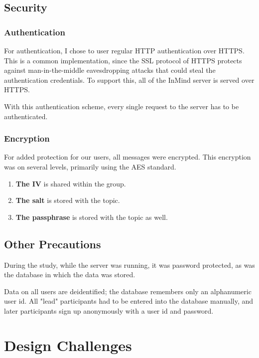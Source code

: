     \subsection{Security}
    \label{sec:security}
      \subsubsection{Authentication}
        For authentication, I chose to user regular HTTP authentication over HTTPS.
        This is a common implementation, since the SSL protocol of HTTPS
        protects against man-in-the-middle
        eavesdropping attacks that could steal the authentication credentials.
        To support this, all of the InMind server is served over HTTPS.

        With this authentication scheme,
        every single request to the server has to be authenticated.

      \subsubsection{Encryption}
        For added protection for our users, all messages were encrypted.
        This encryption was on several levels, primarily using the AES standard.

        \begin{enumerate}
        \item \textbf{The IV} is shared within the group.
        \item \textbf{The salt} is stored with the topic.
        \item \textbf{The passphrase} is stored with the topic as well.
        \end{enumerate}

      \subsection{Other Precautions}
      During the study, while the server was running, it was password protected,
      as was the database in which the data was stored.

      Data on all users are deidentified;
      the database remembers only an alphanumeric user id.
      All "lead" participants had to be entered into the database manually,
      and later participants sign up anonymously with a user id and password.

  \section{Design Challenges}
